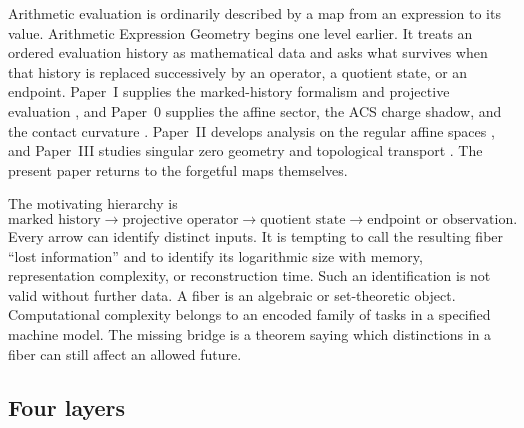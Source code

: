 Arithmetic evaluation is ordinarily described by a map from an expression to
its value.  Arithmetic Expression Geometry begins one level earlier.  It treats
an ordered evaluation history as mathematical data and asks what survives when
that history is replaced successively by an operator, a quotient state, or an
endpoint.  Paper~I supplies the marked-history formalism and projective evaluation
\cite{Yuan2026AEGFoundations}, and Paper~0 supplies the affine sector, the ACS
charge shadow, and the contact curvature \cite{Yuan2026AEGPaperZero}.
Paper~II develops analysis on the regular affine spaces
\cite{Yuan2026AEGFunctionTheory}, and Paper~III studies singular zero geometry
and topological transport \cite{Yuan2026AEGZeroGeometry}.  The present paper
returns to the forgetful maps themselves.

The motivating hierarchy is
\begin{equation}
  \text{marked history}
  \longrightarrow
  \text{projective operator}
  \longrightarrow
  \text{quotient state}
  \longrightarrow
  \text{endpoint or observation}.
  \label{eq:intro-hierarchy}
\end{equation}
Every arrow can identify distinct inputs.  It is tempting to call the resulting
fiber ``lost information'' and to identify its logarithmic size with memory,
representation complexity, or reconstruction time.  Such an identification is
not valid without further data.  A fiber is an algebraic or set-theoretic
object.  Computational complexity belongs to an encoded family of tasks in a
specified machine model.  The missing bridge is a theorem saying which
distinctions in a fiber can still affect an allowed future.

\subsection{Four layers}

